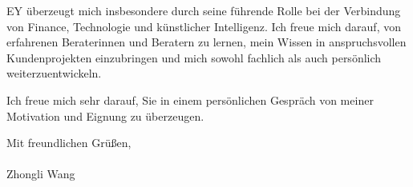 \documentclass[11pt]{article}
\begin{document}
EY überzeugt mich insbesondere durch seine führende Rolle bei der Verbindung von Finance, Technologie und künstlicher Intelligenz. Ich freue mich darauf, von erfahrenen Beraterinnen und Beratern zu lernen, mein Wissen in anspruchsvollen Kundenprojekten einzubringen und mich sowohl fachlich als auch persönlich weiterzuentwickeln.

Ich freue mich sehr darauf, Sie in einem persönlichen Gespräch von meiner Motivation und Eignung zu überzeugen.

\vspace{0.15cm}

\noindent Mit freundlichen Grü\ss{}en, \\
\vspace{5mm}\\
\noindent Zhongli Wang
\end{document}
